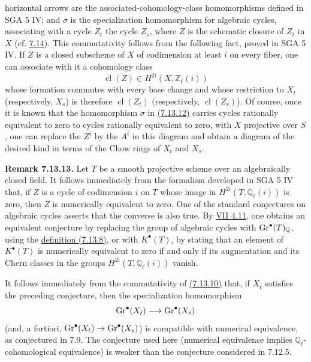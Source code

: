 horizontal arrows are the associated-cohomology-class homomorphisms defined
in SGA 5 IV; and $\sigma$ is the specialization homomorphism for algebraic
cycles, associating with a cycle $Z_t$ the cycle $Z_s$, where $Z$ is the
schematic closure of $Z_t$ in $X$ (cf. \hyperlink{sga6.e10.sec.7.14}{7.14}). This commutativity follows from
the following fact, proved in SGA 5 IV. If $Z$ is a closed subscheme of $X$
of codimension at least $i$ on every fiber, one can associate with it a
cohomology class
\[
\operatorname{cl}(Z)\in H^{2i}(X,\mathbb Z_\ell(i))
\]
whose formation commutes with every base change and whose restriction to
$X_t$ (respectively, $X_s$) is therefore
$\operatorname{cl}(Z_t)$ (respectively, $\operatorname{cl}(Z_s)$). Of course,
once it is known that the homomorphism $\sigma$ in \hyperlink{sga6.e10.eq.7-13-12}{(7.13.12)} carries cycles
rationally equivalent to zero to cycles rationally equivalent to zero, with
$X$ projective over $S$,
one can replace the $Z^i$ by the $A^i$ in this diagram and obtain a diagram
of the desired kind in terms of the Chow rings of $X_t$ and $X_s$.

\textbf{Remark 7.13.13.}
Let $T$ be a smooth projective scheme over an algebraically closed field. It
follows immediately from the formalism developed in SGA 5 IV that, if $Z$ is
a cycle of codimension $i$ on $T$ whose image in
$H^{2i}(T,\mathbb Q_\ell(i))$ is zero, then $Z$ is numerically equivalent to
zero. One of the standard conjectures on algebraic cycles asserts that the
converse is also true. By \hyperlink{sga6.e07.prop.4-11}{VII 4.11}, one obtains an equivalent conjecture by
replacing the group of algebraic cycles with $\operatorname{Gr}^\bullet(T)_{\mathbb Q}$,
using the \hyperlink{sga6.e10.eq.7-13-8}{definition (7.13.8)}, or with $K^\bullet(T)$, by stating that an
element of $K^\bullet(T)$ is numerically equivalent to zero if and only if
its augmentation and its Chern classes in the groups
$H^{2i}(T,\mathbb Q_\ell(i))$ vanish.

It follows immediately from the commutativity of \hyperlink{sga6.e10.eq.7-13-10}{(7.13.10)} that, if
$X_{\bar t}$ satisfies the preceding conjecture, then the specialization
homomorphism
\[
\operatorname{Gr}^\bullet(X_{\bar t})\longrightarrow\operatorname{Gr}^\bullet(X_{\bar s})
\]
(and, a fortiori, $\operatorname{Gr}^\bullet(X_t)\to\operatorname{Gr}^\bullet(X_s)$) is compatible with
numerical equivalence, as conjectured in 7.9. The conjecture used here
(numerical equivalence implies $\mathbb Q_\ell$-cohomological equivalence) is
weaker than the conjecture considered in 7.12.5.

